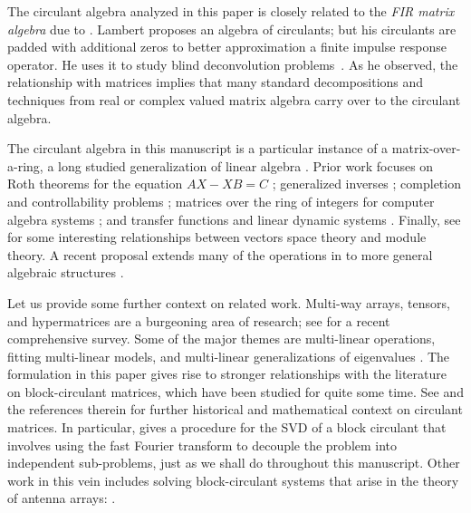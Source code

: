 \documentclass[1p,authoryear,letterpaper]{elsarticle}
\renewcommand{\cite}{\citep}
\begin{document}
The circulant algebra analyzed in this paper is closely related to the
\emph{FIR matrix algebra} due to
\citet[Chapter 3]{lambert1996-thesis}.
Lambert proposes an algebra
of circulants; but his circulants are
padded with additional zeros to better
approximation a finite impulse response
operator.  He uses it to study
blind deconvolution problems~\cite{lambert2001-polynomials-svd}.
As he observed, the relationship with matrices implies that many
standard decompositions and techniques from real or complex
valued matrix algebra carry over to the circulant algebra.

The circulant algebra in this
manuscript is a particular instance of a matrix-over-a-ring,
a long studied generalization of linear algebra
\cite{McDonald1984-ring-algebra, brewer1986-linear-systems}.
Prior work focuses on
Roth theorems for the
equation $AX - XB=C$ \cite{Gustafson1979-Roth-theorems}; generalized inverses
\cite{Prasad1994-generalized}; completion and
controllability problems \cite{Gurvits1992-controllability};
matrices over the ring of integers for
computer algebra systems \cite{Hafner1991-matrices-over-rings};
and transfer functions and linear dynamic systems \cite{Sontag1976-ring-systems}.
Finally, see \citet{Gustafson1991-modules-and-matrices} for some interesting relationships between vectors space
theory and module theory.
A recent proposal extends many of
the operations in \citet{kilmer2008-circ-tensor-svd}
to more general algebraic structures \cite{Navasca2010-modules}.

Let us provide some further context on related work.
Multi-way arrays, tensors, and hypermatrices
are a burgeoning area of research;
see \citet{kolda2009-tensor-decompositions}
for a recent  comprehensive survey.  Some
of the major themes are multi-linear
operations, fitting multi-linear
models, and multi-linear generalizations
of eigenvalues \cite{Qi2007-tensor-eigenvalues}.
The formulation in this paper gives rise to stronger
relationships with the literature
on block-circulant matrices,
which have
been studied for quite some time.
See \citet{tee2005-block-circulant} and the references therein 
for further historical and mathematical context on circulant matrices.
In particular, \citet{baker1989-block-circulant-svd} gives a procedure
for the SVD of a block circulant that involves using
the fast Fourier transform to decouple
the problem into independent sub-problems, just
as we shall do throughout this manuscript.
Other work in this vein includes solving
block-circulant systems that arise in
the theory of antenna arrays: \cite{sinott1973-antenna-arrays,mazancourt1983-block-circulant,vescovo1997-block-circulant}.
\end{document}
